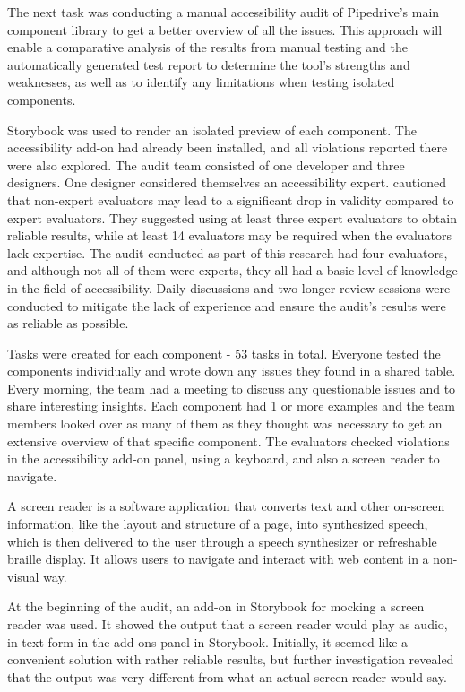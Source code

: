 \documentclass{master_thesis}
\begin{document}
The next task was conducting a manual accessibility audit of Pipedrive's main component library to get a better overview of all the issues. This approach will enable a comparative analysis of the results from manual testing and the automatically generated test report to determine the tool's strengths and weaknesses, as well as to identify any limitations when testing isolated components.

Storybook was used to render an isolated preview of each component. The accessibility add-on had already been installed, and all violations reported there were also explored. The audit team consisted of one developer and three designers. One designer considered themselves an accessibility expert. \citeauthor{Brajnik2011} cautioned that non-expert evaluators may lead to a significant drop in validity compared to expert evaluators. They suggested using at least three expert evaluators to obtain reliable results, while at least 14 evaluators may be required when the evaluators lack expertise. The audit conducted as part of this research had four evaluators, and although not all of them were experts, they all had a basic level of knowledge in the field of accessibility. Daily discussions and two longer review sessions were conducted to mitigate the lack of experience and ensure the audit's results were as reliable as possible.

Tasks were created for each component - 53 tasks in total. Everyone tested the components individually and wrote down any issues they found in a shared table. Every morning, the team had a meeting to discuss any questionable issues and to share interesting insights. Each component had 1 or more examples and the team members looked over as many of them as they thought was necessary to get an extensive overview of that specific component. The evaluators checked violations in the accessibility add-on panel, using a keyboard, and also a screen reader to navigate.

A screen reader is a software application that converts text and other on-screen information, like the layout and structure of a page, into synthesized speech, which is then delivered to the user through a speech synthesizer or refreshable braille display\citep{Watson}. It allows users to navigate and interact with web content in a non-visual way.

At the beginning of the audit, an add-on in Storybook for mocking a screen reader \citep{Lara} was used. It showed the output that a screen reader would play as audio, in text form in the add-ons panel in Storybook. Initially, it seemed like a convenient solution with rather reliable results, but further investigation revealed that the output was very different from what an actual screen reader would say.
\end{document}

